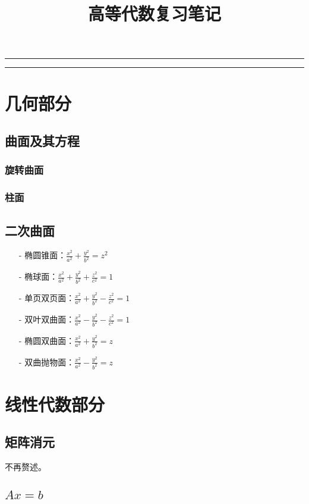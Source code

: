 \documentclass[UTF8]{ctexart}
\title{高等代数复习笔记}
\date{}
\begin{document}
\maketitle
\pagestyle{plain}
\hrule
\tableofcontents
\hrule
\section{几何部分}
\subsection{曲面及其方程}

\subsubsection{旋转曲面}
\subsubsection{柱面}

\subsection{二次曲面}
\begin{itemize}
    \item [-]椭圆锥面：$\frac{x^{2}}{a^{2}}+\frac{y^{2}}{b^{2}}=z^{2}$
    \item [-]椭球面：$\frac{x^{2}}{a^{2}}+\frac{y^{2}}{b^{2}}+\frac{z^{2}}{c^{2}}=1$
    \item [-]单页双页面：$\frac{x^{2}}{a^{2}}+\frac{y^{2}}{b^{2}}-\frac{z^{2}}{c^{2}}=1$
    \item [-]双叶双曲面：$\frac{x^{2}}{a^{2}}-\frac{y^{2}}{b^{2}}-\frac{z^{2}}{c^{2}}=1$
    \item [-]椭圆双曲面：$\frac{x^{2}}{a^{2}}+\frac{y^{2}}{b^{2}}=z$
    \item [-]双曲抛物面：$\frac{x^{2}}{a^{2}}-\frac{y^{2}}{b^{2}}=z$
\end{itemize}
\section{线性代数部分}
\subsection{矩阵消元}不再赘述。
\subsection{$Ax=b$}
\end{document}
